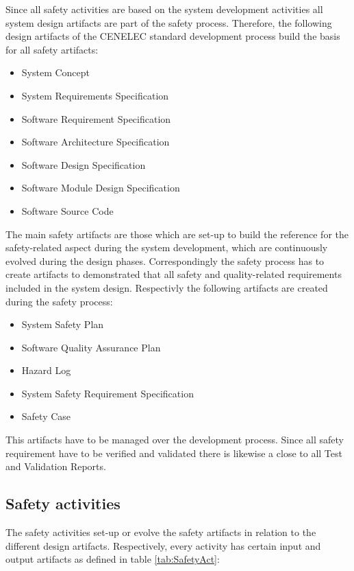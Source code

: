 \documentclass{template/openetcs_article}
\begin{document}
Since all safety activities are based on the system development activities all system design artifacts are part of the safety process. Therefore, the following design artifacts of the CENELEC standard development process build the basis for all safety artifacts:

\begin{itemize}
\item System Concept
\item System Requirements Specification
\item Software Requirement Specification
\item Software Architecture Specification
\item Software Design Specification
\item Software Module Design Specification
\item Software Source Code
\end{itemize}

The main safety artifacts are those which are set-up to build the reference for the safety-related aspect during the system development, which are continuously evolved during the design phases. Correspondingly the safety process has to create artifacts to demonstrated that all safety and quality-related requirements included in the system design. Respectivly the following artifacts are created during the safety process:

\begin{itemize}
\item System Safety Plan
\item Software Quality Assurance Plan
\item Hazard Log
\item System Safety Requirement Specification
\item Safety Case
\end{itemize} 

This artifacts have to be managed over the development process. Since all safety requirement have to be verified and validated there is likewise a close to all Test and Validation Reports.

\subsection{Safety activities}
\label{safetyactivities}
The safety activities set-up or evolve the safety artifacts in relation to the different design artifacts. Respectively, every activity has certain input and output artifacts as defined in table \ref{tab:SafetyAct}:
\end{document}
